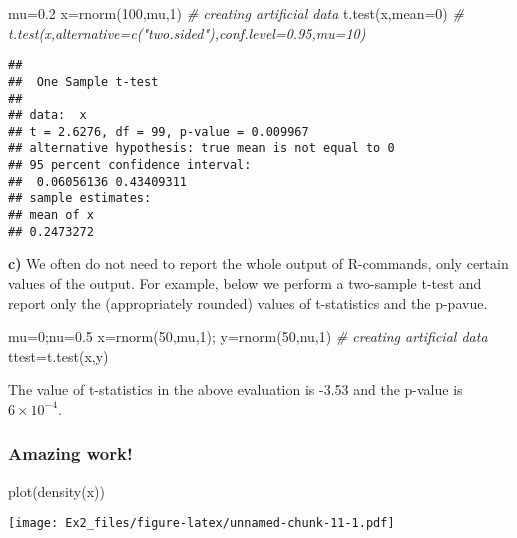 \documentclass[
  11pt,
]{article}
\newenvironment{Shaded}{\begin{snugshade}}{\end{snugshade}}
\newcommand{\AttributeTok}[1]{\textcolor[rgb]{0.77,0.63,0.00}{#1}}
\newcommand{\CommentTok}[1]{\textcolor[rgb]{0.56,0.35,0.01}{\textit{#1}}}
\newcommand{\DecValTok}[1]{\textcolor[rgb]{0.00,0.00,0.81}{#1}}
\newcommand{\FloatTok}[1]{\textcolor[rgb]{0.00,0.00,0.81}{#1}}
\newcommand{\FunctionTok}[1]{\textcolor[rgb]{0.00,0.00,0.00}{#1}}
\newcommand{\NormalTok}[1]{#1}
\newcommand{\OtherTok}[1]{\textcolor[rgb]{0.56,0.35,0.01}{#1}}
\begin{document}
\begin{Shaded}
\begin{Highlighting}[]
\NormalTok{mu}\OtherTok{=}\FloatTok{0.2}
\NormalTok{x}\OtherTok{=}\FunctionTok{rnorm}\NormalTok{(}\DecValTok{100}\NormalTok{,mu,}\DecValTok{1}\NormalTok{) }\CommentTok{\# creating artificial data}
\FunctionTok{t.test}\NormalTok{(x,}\AttributeTok{mean=}\DecValTok{0}\NormalTok{)   }\CommentTok{\# t.test(x,alternative=c("two.sided"),conf.level=0.95,mu=10)}
\end{Highlighting}
\end{Shaded}

\begin{verbatim}
## 
##  One Sample t-test
## 
## data:  x
## t = 2.6276, df = 99, p-value = 0.009967
## alternative hypothesis: true mean is not equal to 0
## 95 percent confidence interval:
##  0.06056136 0.43409311
## sample estimates:
## mean of x 
## 0.2473272
\end{verbatim}

\textbf{c)} We often do not need to report the whole output of
R-commands, only certain values of the output. For example, below we
perform a two-sample t-test and report only the (appropriately rounded)
values of t-statistics and the p-pavue.

\begin{Shaded}
\begin{Highlighting}[]
\NormalTok{mu}\OtherTok{=}\DecValTok{0}\NormalTok{;nu}\OtherTok{=}\FloatTok{0.5}
\NormalTok{x}\OtherTok{=}\FunctionTok{rnorm}\NormalTok{(}\DecValTok{50}\NormalTok{,mu,}\DecValTok{1}\NormalTok{); y}\OtherTok{=}\FunctionTok{rnorm}\NormalTok{(}\DecValTok{50}\NormalTok{,nu,}\DecValTok{1}\NormalTok{) }\CommentTok{\# creating artificial data}
\NormalTok{ttest}\OtherTok{=}\FunctionTok{t.test}\NormalTok{(x,y) }
\end{Highlighting}
\end{Shaded}

The value of t-statistics in the above evaluation is -3.53 and the
p-value is \ensuremath{6\times 10^{-4}}.

\hypertarget{amazing-work}{%
\subsubsection{Amazing work!}\label{amazing-work}}

\begin{Shaded}
\begin{Highlighting}[]
\FunctionTok{plot}\NormalTok{(}\FunctionTok{density}\NormalTok{(x))}
\end{Highlighting}
\end{Shaded}

\texttt{[image: Ex2\_files/figure-latex/unnamed-chunk-11-1.pdf]}
\end{document}
